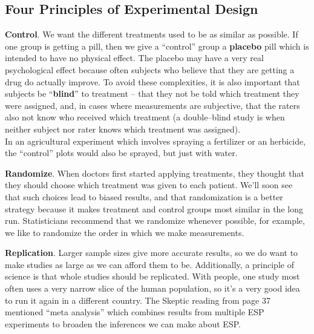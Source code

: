 \subsection { Four Principles of Experimental Design}

  {\bf Control}.  We want the different treatments used to be as
  similar as possible.  If one group is getting a pill, then we give
  a ``control'' group a {\bf placebo} pill which is intended to have no
  physical effect.  The placebo may have a very real psychological effect 
  because often subjects who believe that they are getting a drug 
  do actually improve.  To avoid these complexities, it is also
  important that subjects be ``{\bf blind}'' to treatment -- that they
  not be told which treatment they were assigned, and, in cases where
  measurements are subjective, that the raters also not know who
  received which treatment (a double--blind study is when neither
  subject nor rater knows which treatment was assigned).  
  \\
  In an agricultural experiment which involves spraying a fertilizer
  or an herbicide, the ``control'' plots would also be sprayed, but just
  with water. 

  {\bf Randomize}.  When doctors first started applying treatments,
  they thought that they should choose which treatment was given to each
  patient. We'll soon see that such choices lead to biased results, and
  that randomization is a better strategy because it makes treatment
  and control groups most similar in the long run.  Statisticians
  recommend that we randomize whenever possible, for example, we like
  to randomize the order in which we make measurements.

  {\bf Replication}. Larger sample sizes give more accurate results,
  so we do want to make studies as large as we can afford them to
  be. Additionally, a principle of science is that  whole
  studies should be replicated.  With people, one study most often uses a
  very narrow slice of the human population, so it's a very good idea
  to run it again in a different country.  The Skeptic reading from
  page 37 mentioned ``meta analysis'' which combines results from
  multiple ESP experiments to broaden the inferences we can make about
  ESP. 

